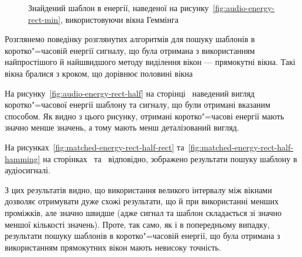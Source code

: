 \begin{figure}[h]

            \caption{Знайдений шаблон в енергії, наведеної на рисунку~\ref{fig:audio-energy-rect-min},
                використовуючи вікна Геммінга}
            \label{fig:matched-energy-rect-min-hamming}
        \end{figure}

        \clearpage

        Розглянемо поведінку розглянутих алгоритмів для пошуку шаблонів в коротко"=часовій енергії сигналу, що була
        отримана з використанням найпростішого й найшвидшого методу виділення вікон --- прямокутні вікна.
        Такі вікна бралися з кроком, що дорівнює половині вікна

        На рисунку~\ref{fig:audio-energy-rect-half} на сторінці~\pageref{fig:audio-energy-rect-half} наведений
        вигляд коротко"=часової енергії шаблону та сигналу, що були отримані вказаним способом.
        Як видно з цього рисунку, отримані коротко"=часові енергії мають значно менше значень, а тому мають менш
        деталізований вигляд.

        На рисунках~\ref{fig:matched-energy-rect-half-rect} та~\ref{fig:matched-energy-rect-half-hamming} на
        сторінках~\pageref{fig:matched-energy-rect-half-rect} та~\pageref{fig:matched-energy-rect-half-hamming}
        відповідно, зображено результати пошуку шаблону в аудіосигналі.

        З цих результатів видно, що використання великого інтервалу між вікнами дозволяє отримувати дуже схожі
        результати, що й при використанні менших проміжків, але значно швидше (адже сигнал та шаблон складається зі
        значно меншої кількості значень).
        Проте, так само, як і в попередньому випадку, результати пошуку шаблонів в коротко"=часовій енергії, що була
        отримана з використанням прямокутних вікон мають невисоку точність.

